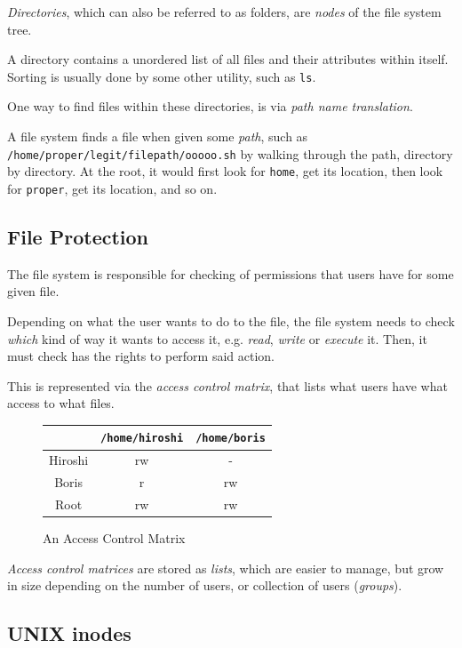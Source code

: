 \documentclass[a4]{article}
\begin{document}
\textit{Directories}, which can also be referred to as folders, are \textit{nodes} of the file system tree.

A directory contains a unordered list of all files and their attributes within itself. Sorting is usually done by some other utility, such as \texttt{ls}.

One way to find files within these directories, is via \textit{path name translation}.

A file system finds a file when given some \textit{path}, such as \texttt{/home/proper/legit/filepath/ooooo.sh} by walking through the path, directory by directory. At the root, it would first look for \texttt{home}, get its location, then look for \texttt{proper}, get its location, and so on.

\subsection{File Protection}

The file system is responsible for checking of permissions that users have for some given file.

Depending on what the user wants to do to the file, the file system needs to check \textit{which} kind of way it wants to access it, e.g. \textit{read}, \textit{write} or \textit{execute} it. Then, it must check has the rights to perform said action.

This is represented via the \textit{access control matrix}, that lists what users have what access to what files.

\begin{figure}[H]
  \centering
  \begin{tabular}{|c|c|c|}
    \hline
    & \texttt{/home/hiroshi} & \texttt{/home/boris}\\
    \hline
    Hiroshi & rw & -\\
    \hline
    Boris & r & rw\\
    \hline
    Root & rw & rw\\
    \hline
  \end{tabular}
  \caption{An Access Control Matrix}
\end{figure}

\textit{Access control matrices} are stored as \textit{lists}, which are easier to manage, but grow in size depending on the number of users, or collection of users (\textit{groups}).

\subsection{UNIX inodes}
\end{document}
